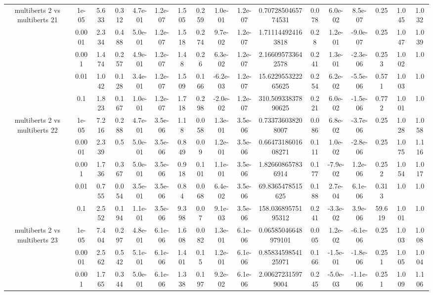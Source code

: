 \begin{tabular}{|c|c|c|c|c|c|c|c|c|c|c|c|c|c|c|c|c|}
\hline
\multirow{5}{*}{multiberts 2 vs multiberts 21} & 1e-05 & 5.633 & 0.312 & 4.7e-01 & 1.2e-07 & 1.505 & 0.259 & 1.0e-01 & 1.2e-07 & 0.7072850465774531 & 0.078 & 6.0e-02 & 8.5e-07 & 0.25 & 1.045 & 1.032 \\
 & 0.0001 & 2.334 & 0.488 & 5.0e-01 & 1.2e-07 & 1.518 & 0.274 & 9.7e-02 & 1.2e-07 & 1.711144924163818 & 0.28 & 1.2e-01 & -9.0e-07 & 0.25 & 1.047 & 1.039 \\
 & 0.001 & 1.474 & 0.257 & 4.9e-01 & 1.2e-07 & 1.48 & 0.26 & 6.3e-02 & 1.2e-07 & 2.166095733642578 & 0.241 & 1.3e-01 & -2.3e-06 & 0.253 & 1.002 & 1.0 \\
 & 0.01 & 1.042 & 0.128 & 3.4e-01 & 1.2e-07 & 1.509 & 0.166 & -6.2e-03 & 1.2e-07 & 15.622955322265625 & 0.254 & 6.2e-02 & -5.5e-06 & 0.571 & 1.003 & 1.0 \\
 & 0.1 & 1.823 & 0.167 & 1.0e-01 & 1.2e-07 & 1.718 & 0.298 & -2.0e-02 & 1.2e-07 & 310.50933837890625 & 0.221 & 6.0e-02 & -1.5e-06 & 0.772 & 1.001 & 1.0 \\
\hline
\multirow{5}{*}{multiberts 2 vs multiberts 22} & 1e-05 & 7.216 & 0.288 & 4.7e-01 & 3.5e-06 & 1.18 & 0.058 & 1.3e-01 & 3.5e-06 & 0.733736038208007 & 0.086 & 6.8e-02 & -3.7e-06 & 0.25 & 1.028 & 1.058 \\
 & 0.0001 & 2.339 & 0.5 & 5.0e-01 & 3.5e-06 & 0.849 & 0.09 & 1.2e-01 & 3.5e-06 & 0.6647318601608271 & 0.111 & 1.0e-02 & -2.8e-06 & 0.25 & 1.075 & 1.116 \\
 & 0.001 & 1.736 & 0.367 & 5.0e-01 & 3.5e-06 & 0.918 & 0.101 & 1.1e-01 & 3.5e-06 & 1.826608657836914 & 0.177 & -7.9e-02 & 1.2e-06 & 0.252 & 1.054 & 1.017 \\
 & 0.01 & 0.755 & 0.054 & 3.5e-01 & 3.5e-06 & 0.84 & 0.068 & 6.4e-02 & 3.5e-06 & 69.8365478515625 & 0.188 & 2.7e-04 & 6.1e-06 & 0.313 & 1.0 & 1.0 \\
 & 0.1 & 2.552 & 0.194 & 1.1e-01 & 3.5e-06 & 9.398 & 0.07 & 9.1e-03 & 3.5e-06 & 158.03689575195312 & 0.241 & -3.3e-02 & 3.9e-06 & 59.619 & 1.001 & 1.0 \\
\hline
\multirow{5}{*}{multiberts 2 vs multiberts 23} & 1e-05 & 7.404 & 0.297 & 4.8e-01 & 6.1e-06 & 1.608 & 0.082 & 1.3e-01 & 6.1e-06 & 0.06585046648979101 & 0.005 & 1.2e-02 & -6.1e-06 & 0.25 & 1.003 & 1.008 \\
 & 0.0001 & 2.562 & 0.542 & 5.1e-01 & 6.1e-06 & 1.401 & 0.15 & 1.2e-01 & 6.1e-06 & 0.8583459854125971 & 0.166 & -1.5e-01 & -1.8e-06 & 0.251 & 1.005 & 1.004 \\
 & 0.001 & 1.765 & 0.344 & 5.0e-01 & 6.1e-06 & 1.338 & 0.197 & 9.2e-02 & 6.1e-06 & 2.006272315979004 & 0.245 & -5.0e-03 & -1.1e-06 & 0.251 & 1.009 & 1.106 \\

\end{tabular}

